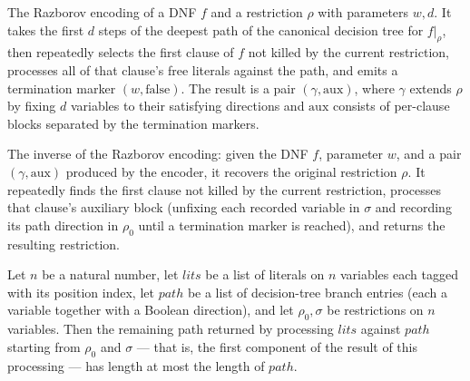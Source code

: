 \begin{definition}
\label{SwitchingLemma.razborovEncode}
\leanok
{}
The Razborov encoding of a DNF $f$ and a restriction $\rho$ with parameters $w, d$.
It takes the first $d$ steps of the deepest path of the canonical decision tree for
$f|_\rho$, then repeatedly selects the first clause of $f$ not killed by the current
restriction, processes all of that clause's free literals against the path, and emits
a termination marker $(w, \mathrm{false})$. The result is a pair $(\gamma, \mathrm{aux})$,
where $\gamma$ extends $\rho$ by fixing $d$ variables to their satisfying directions
and $\mathrm{aux}$ consists of per-clause blocks separated by the termination markers.
\end{definition}

\begin{definition}
\label{SwitchingLemma.razborovDecode}
\leanok
{}
The inverse of the Razborov encoding: given the DNF $f$, parameter $w$, and a pair
$(\gamma, \mathrm{aux})$ produced by the encoder, it recovers the original restriction
$\rho$. It repeatedly finds the first clause not killed by the current restriction,
processes that clause's auxiliary block (unfixing each recorded variable in $\sigma$
and recording its path direction in $\rho_0$ until a termination marker is reached),
and returns the resulting restriction.
\end{definition}

\begin{lemma}
\label{SwitchingLemma.processClauseLits_path_le}
\leanok
{}
Let $n$ be a natural number, let $\mathit{lits}$ be a list of literals on $n$ variables
each tagged with its position index, let $\mathit{path}$ be a list of decision-tree
branch entries (each a variable together with a Boolean direction), and let $\rho_0,
\sigma$ be restrictions on $n$ variables. Then the remaining path returned by processing
$\mathit{lits}$ against $\mathit{path}$ starting from $\rho_0$ and $\sigma$ — that is,
the first component of the result of this processing — has length at most the length of
$\mathit{path}$.
\end{lemma}

